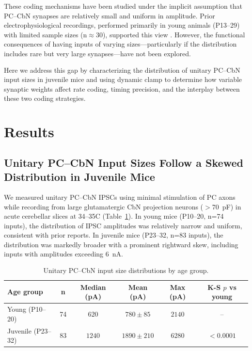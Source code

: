 \documentclass[11pt]{article}
\begin{document}
These coding mechanisms have been studied under the implicit assumption that PC--CbN synapses are relatively small and uniform in amplitude. Prior electrophysiological recordings, performed primarily in young animals (P13--29) with limited sample sizes (n$\approx$30), supported this view \citep{telgkamp2004maintenance, person2012purkinje}. However, the functional consequences of having inputs of varying sizes---particularly if the distribution includes rare but very large synapses---have not been explored.

Here we address this gap by characterizing the distribution of unitary PC--CbN input sizes in juvenile mice and using dynamic clamp to determine how variable synaptic weights affect rate coding, timing precision, and the interplay between these two coding strategies.

\section{Results}

\subsection{Unitary PC--CbN Input Sizes Follow a Skewed Distribution in Juvenile Mice}

We measured unitary PC--CbN IPSCs using minimal stimulation of PC axons while recording from large glutamatergic CbN projection neurons ($>$70~pF) in acute cerebellar slices at 34--35\textdegree C (Table~\ref{tab:inputs}). In young mice (P10--20, n=74 inputs), the distribution of IPSC amplitudes was relatively narrow and uniform, consistent with prior reports. In juvenile mice (P23--32, n=83 inputs), the distribution was markedly broader with a prominent rightward skew, including inputs with amplitudes exceeding 6~nA.

\begin{table}[H]
\centering
\caption{Unitary PC--CbN input size distributions by age group.}
\label{tab:inputs}
\begin{tabular}{lccccc}
\toprule
\textbf{Age group} & \textbf{n} & \textbf{Median (pA)} & \textbf{Mean (pA)} & \textbf{Max (pA)} & \textbf{K-S $p$ vs young} \\
\midrule
Young (P10--20) & 74 & $620$ & $780 \pm 85$ & $2140$ & -- \\
Juvenile (P23--32) & 83 & $1240$ & $1890 \pm 210$ & $6280$ & $<0.0001$ \\
\bottomrule
\end{tabular}
\end{table}
\end{document}
